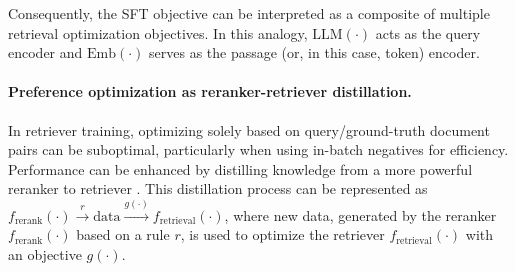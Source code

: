 Consequently, the SFT objective can be interpreted as a composite of multiple retrieval optimization objectives. In this analogy, $\text{LLM}(\cdot)$ acts as the query encoder and $\text{Emb}(\cdot)$ serves as the passage (or, in this case, token) encoder.






\paragraph{Preference optimization as reranker-retriever distillation.}
In retriever training, optimizing solely based on query/ground-truth document pairs can be suboptimal, particularly when using in-batch negatives for efficiency. Performance can be enhanced by distilling knowledge from a more powerful reranker to retriever \citep{qu2020rocketqa,zeng2022curriculum}. This distillation process can be represented as $f_{\text{rerank}}(\cdot) \overset{r}{\rightarrow} \text{data}   \overset{g(\cdot)}{\rightarrow}  f_{\text{retrieval}}(\cdot)$, where new data, generated by the reranker $f_{\text{rerank}}(\cdot)$ based on a rule $r$, is used to optimize the retriever $f_{\text{retrieval}}(\cdot)$ with an objective $g(\cdot)$.

